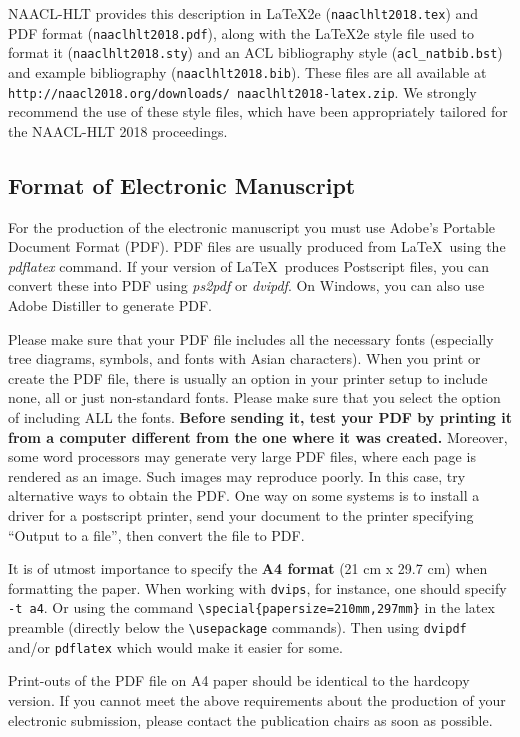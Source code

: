 NAACL-HLT provides this description in \LaTeX2e{} ({\small\tt naaclhlt2018.tex}) and PDF
format ({\small\tt naaclhlt2018.pdf}), along with the \LaTeX2e{} style file used to
format it ({\small\tt naaclhlt2018.sty}) and an ACL bibliography style ({\small\tt acl\_natbib.bst})
and example bibliography ({\small\tt naaclhlt2018.bib}).
These files are all available at
{\small\tt http://naacl2018.org/downloads/ naaclhlt2018-latex.zip}. 
 We
strongly recommend the use of these style files, which have been
appropriately tailored for the NAACL-HLT 2018 proceedings.

\subsection{Format of Electronic Manuscript}
\label{sect:pdf}

For the production of the electronic manuscript you must use Adobe's
Portable Document Format (PDF). PDF files are usually produced from
\LaTeX\ using the \textit{pdflatex} command. If your version of
\LaTeX\ produces Postscript files, you can convert these into PDF
using \textit{ps2pdf} or \textit{dvipdf}. On Windows, you can also use
Adobe Distiller to generate PDF.

Please make sure that your PDF file includes all the necessary fonts
(especially tree diagrams, symbols, and fonts with Asian
characters). When you print or create the PDF file, there is usually
an option in your printer setup to include none, all or just
non-standard fonts.  Please make sure that you select the option of
including ALL the fonts. \textbf{Before sending it, test your PDF by
  printing it from a computer different from the one where it was
  created.} Moreover, some word processors may generate very large PDF
files, where each page is rendered as an image. Such images may
reproduce poorly. In this case, try alternative ways to obtain the
PDF. One way on some systems is to install a driver for a postscript
printer, send your document to the printer specifying ``Output to a
file'', then convert the file to PDF.

It is of utmost importance to specify the \textbf{A4 format} (21 cm
x 29.7 cm) when formatting the paper. When working with
{\tt dvips}, for instance, one should specify {\tt -t a4}.
Or using the command \verb|\special{papersize=210mm,297mm}| in the latex
preamble (directly below the \verb|\usepackage| commands). Then using 
{\tt dvipdf} and/or {\tt pdflatex} which would make it easier for some.

Print-outs of the PDF file on A4 paper should be identical to the
hardcopy version. If you cannot meet the above requirements about the
production of your electronic submission, please contact the
publication chairs as soon as possible.

